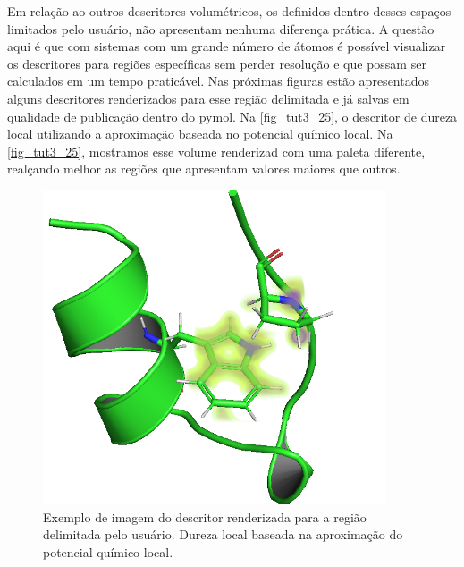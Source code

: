 \documentclass[a4paper,11pt]{refart}
\begin{document}
Em relação ao outros descritores volumétricos, os definidos dentro desses espaços limitados pelo usuário, não apresentam nenhuma diferença prática. A questão aqui é que com sistemas com um grande número de átomos é possível visualizar os descritores para regiões específicas sem perder resolução e que possam ser calculados em um tempo praticável. Nas próximas figuras estão apresentados alguns descritores renderizados para esse região delimitada e já salvas em qualidade de publicação dentro do pymol. Na \autoref{fig_tut3_25}, o descritor de dureza local utilizando a aproximação baseada no potencial químico local. Na \autoref{fig_tut3_25}, mostramos esse volume renderizad com uma paleta diferente, realçando melhor as regiões que apresentam valores maiores que outros. 

\hspace*{-\leftmarginwidth}
\begin{minipage}{\fullwidth}
	\begin{figure}[H]
		\begin{center}
			\includegraphics[width=4in]{images/tut3_img26}
			\caption{Exemplo de imagem do descritor renderizada para a região delimitada pelo usuário. Dureza local baseada na aproximação do potencial químico local.}
			\label{fig_tut3_25}
		\end{center}
	\end{figure}
\end{minipage}
\end{document}
